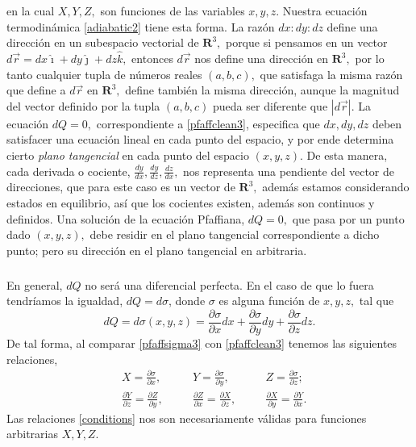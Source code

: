 \documentclass{article}
\theoremstyle{definition} \newtheorem{defi}{Definici\'on}
\theoremstyle{definition} \newtheorem{teo}{Teorema}
\theoremstyle{definition} \newtheorem{cor}{Corolario}
\begin{document}
en la cual $X, Y, Z,$ son funciones de las variables $x,y,z.$ Nuestra ecuaci\'on termodin\'amica \eqref{adiabatic2} tiene esta forma. La raz\'on $dx:dy:dz$ define una direcci\'on en un subespacio vectorial de $\mathbf{R}^3,$ porque si pensamos en un vector $d\vec r = dx\hat \imath + dy\hat \jmath + dz\hat k,$ entonces $d\vec r$ nos define una direcci\'on en $\mathbf{R}^3,$ por lo tanto cualquier tupla de n\'umeros reales $(a,b,c),$ que satisfaga la misma raz\'on que define a $d\vec r$ en $\mathbf{R}^3,$ define tambi\'en la misma direcci\'on, aunque la magnitud del vector definido por la tupla $(a,b,c)$ pueda ser diferente que $|d\vec r|.$ La ecuaci\'on $dQ = 0,$ correspondiente a \eqref{pfaffclean3}, especifica que $dx, dy, dz$ deben satisfacer una ecuaci\'on lineal en cada punto del espacio, y por ende determina cierto \emph{plano tangencial} en cada punto del espacio $(x, y, z).$ De esta manera, cada derivada o cociente, $\frac{dy}{dx},\frac{dy}{dz},\frac{dz}{dx},$ nos representa una pendiente del vector de direcciones, que para este caso es un vector de $\mathbf{R}^3,$ adem\'as estamos considerando estados en equilibrio, as\'i que los cocientes existen, adem\'as son continuos y definidos. Una soluci\'on de la ecuaci\'on Pfaffiana, $dQ = 0,$ que pasa por un punto dado $(x, y, z),$ debe residir en el plano tangencial correspondiente a dicho punto; pero su direcci\'on en el plano tangencial en arbitraria.
\subparagraph{}
En general, $dQ$ no ser\'a una diferencial perfecta. En el caso de que lo fuera tendr\'iamos la igualdad, $dQ = d\sigma$, donde $\sigma$ es alguna funci\'on de $x, y, z,$ tal que
\begin{equation}\label{pfaffsigma3}
dQ = d\sigma(x, y, z)  = \frac{\partial{\sigma}}{\partial{x}}dx + \frac{\partial{\sigma}}{\partial{y}}dy + \frac{\partial{\sigma}}{\partial{z}}dz.
\end{equation}
De tal forma, al comparar \eqref{pfaffsigma3} con \eqref{pfaffclean3} tenemos las siguientes relaciones,
\begin{align}
&X = \frac{\partial \sigma}{\partial x}, &\quad &Y = \frac{\partial \sigma}{\partial y}, &\quad &Z = \frac{\partial \sigma}{\partial z};\\
&\frac{\partial Y}{\partial z} = \frac{\partial Z}{\partial y}, &\quad &\frac{\partial Z}{\partial x} = \frac{\partial X}{\partial z}, &\quad &\frac{\partial X}{\partial y} = \frac{\partial Y}{\partial x}\label{conditions}.
\end{align}
Las relaciones \eqref{conditions} nos son necesariamente v\'alidas para funciones arbitrarias $X, Y, Z.$
\end{document}
